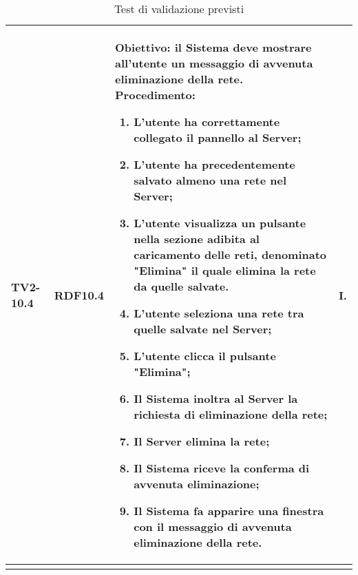 \begin{longtable}{|C{.15\textwidth}|C{.13\textwidth}|m{.52\textwidth}|C{.08\textwidth}|}
TV2-10.4 & RDF10.4 &
	\textbf{Obiettivo}: il Sistema deve mostrare all'utente un messaggio di avvenuta eliminazione della rete. \newline
	\textbf{Procedimento}:
	\begin{enumerate}
		\item L'utente ha correttamente collegato il pannello al Server;
		\item L'utente ha precedentemente salvato almeno una rete nel Server;
		\item L'utente visualizza un pulsante nella sezione adibita al caricamento delle reti, denominato "Elimina" il quale elimina la rete da quelle salvate.
		\item L'utente seleziona una rete tra quelle salvate nel Server;
		\item L'utente clicca il pulsante "Elimina";
		\item Il Sistema inoltra al Server la richiesta di eliminazione della rete;
		\item Il Server elimina la rete;
		\item Il Sistema riceve la conferma di avvenuta eliminazione;
		\item Il Sistema fa apparire una finestra con il messaggio di avvenuta eliminazione della rete.
	\end{enumerate}
	& I. \\
\hline








\caption{Test di validazione previsti}
\label{testvalidazioneprevisti}
\end{longtable}